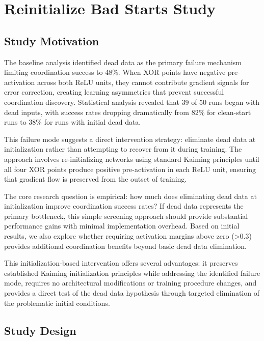 \section{Reinitialize Bad Starts Study}
\label{sec:relu1-reinit}

\subsection*{Study Motivation}

The baseline analysis identified dead data as the primary failure mechanism limiting coordination success to 48\%. When XOR points have negative pre-activation across both ReLU units, they cannot contribute gradient signals for error correction, creating learning asymmetries that prevent successful coordination discovery. Statistical analysis revealed that 39 of 50 runs began with dead inputs, with success rates dropping dramatically from 82\% for clean-start runs to 38\% for runs with initial dead data.

This failure mode suggests a direct intervention strategy: eliminate dead data at initialization rather than attempting to recover from it during training. The approach involves re-initializing networks using standard Kaiming principles until all four XOR points produce positive pre-activation in each ReLU unit, ensuring that gradient flow is preserved from the outset of training.

The core research question is empirical: how much does eliminating dead data at initialization improve coordination success rates? If dead data represents the primary bottleneck, this simple screening approach should provide substantial performance gains with minimal implementation overhead. Based on initial results, we also explore whether requiring activation margins above zero (>0.3) provides additional coordination benefits beyond basic dead data elimination.

This initialization-based intervention offers several advantages: it preserves established Kaiming initialization principles while addressing the identified failure mode, requires no architectural modifications or training procedure changes, and provides a direct test of the dead data hypothesis through targeted elimination of the problematic initial conditions.


\subsection*{Study Design}

